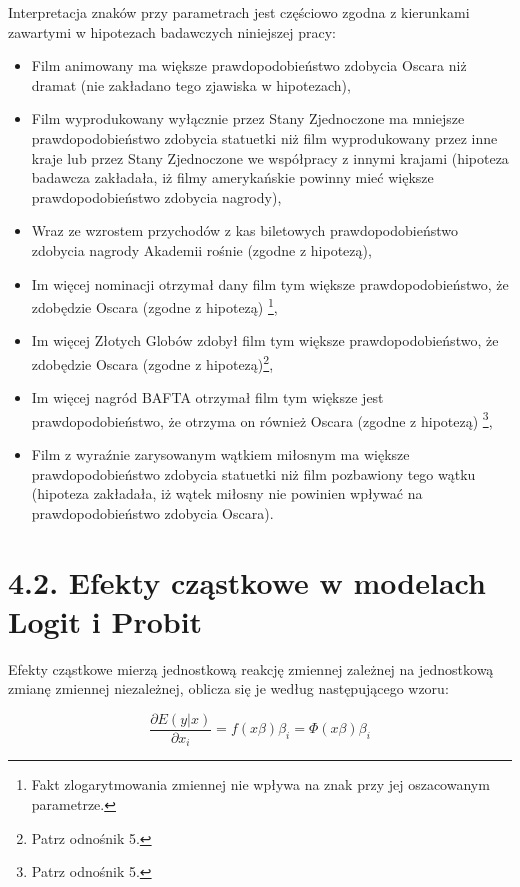 Interpretacja znaków przy parametrach jest częściowo zgodna z kierunkami zawartymi w hipotezach badawczych niniejszej pracy:
 \begin{itemize}
	\item Film animowany ma większe prawdopodobieństwo zdobycia Oscara niż dramat (nie zakładano tego zjawiska w hipotezach),
	\item Film wyprodukowany wyłącznie przez Stany Zjednoczone ma mniejsze prawdopodobieństwo zdobycia statuetki niż film wyprodukowany przez inne kraje lub przez Stany Zjednoczone we współpracy z innymi krajami (hipoteza badawcza zakładała, iż filmy amerykańskie powinny mieć większe prawdopodobieństwo zdobycia nagrody),
	\item Wraz ze wzrostem przychodów z kas biletowych prawdopodobieństwo zdobycia nagrody Akademii rośnie (zgodne z hipotezą),
	\item Im więcej nominacji otrzymał dany film tym większe prawdopodobieństwo, że zdobędzie Oscara (zgodne z hipotezą) \footnote{Fakt zlogarytmowania zmiennej nie wpływa na znak przy jej oszacowanym parametrze.},
	\item Im więcej Złotych Globów zdobył film tym większe prawdopodobieństwo, że zdobędzie Oscara (zgodne z hipotezą)\footnote{Patrz odnośnik 5.},
	\item Im więcej nagród BAFTA otrzymał film tym większe jest prawdopodobieństwo, że otrzyma on również Oscara (zgodne z hipotezą) \footnote{Patrz odnośnik 5.},
	\item Film z wyraźnie zarysowanym wątkiem miłosnym ma większe prawdopodobieństwo zdobycia statuetki niż film pozbawiony tego wątku (hipoteza zakładała, iż wątek miłosny nie powinien wpływać na prawdopodobieństwo zdobycia Oscara).
 \end{itemize}
 
\section*{4.2. Efekty cząstkowe w modelach Logit i Probit}

Efekty cząstkowe mierzą jednostkową reakcję zmiennej zależnej na jednostkową zmianę zmiennej niezależnej, oblicza się je według następującego wzoru:

\begin{equation}
\frac{\partial E(y|x)}{\partial x_i}=f(x\beta)\beta_i=\Phi(x\beta)\beta_i
\end{equation}

